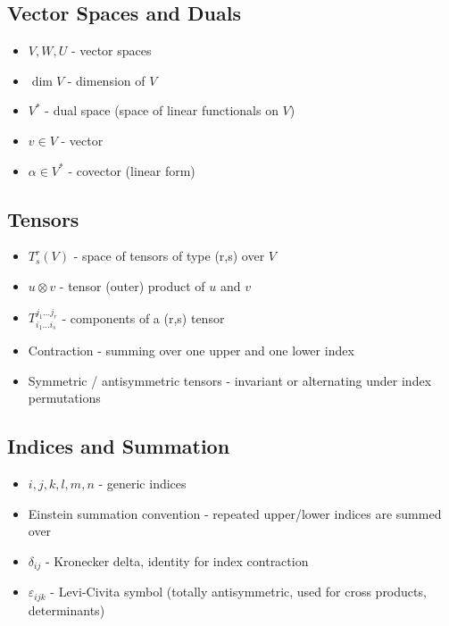 \documentclass[
  letterpaper,
  DIV=11,
  numbers=noendperiod]{scrreprt}
\providecommand{\tightlist}{%
  \setlength{\itemsep}{0pt}\setlength{\parskip}{0pt}}
\begin{document}
\subsection{Vector Spaces and Duals}\label{vector-spaces-and-duals}

\begin{itemize}
\tightlist
\item
  \(V, W, U\) - vector spaces
\item
  \(\dim V\) - dimension of \(V\)
\item
  \(V^*\) - dual space (space of linear functionals on \(V\))
\item
  \(v \in V\) - vector
\item
  \(\alpha \in V^*\) - covector (linear form)
\end{itemize}

\subsection{Tensors}\label{tensors}

\begin{itemize}
\tightlist
\item
  \(T^r_s(V)\) - space of tensors of type (r,s) over \(V\)
\item
  \(u \otimes v\) - tensor (outer) product of \(u\) and \(v\)
\item
  \(T_{i_1 \dots i_s}^{j_1 \dots j_r}\) - components of a (r,s) tensor
\item
  Contraction - summing over one upper and one lower index
\item
  Symmetric / antisymmetric tensors - invariant or alternating under
  index permutations
\end{itemize}

\subsection{Indices and Summation}\label{indices-and-summation}

\begin{itemize}
\tightlist
\item
  \(i,j,k,l,m,n\) - generic indices
\item
  Einstein summation convention - repeated upper/lower indices are
  summed over
\item
  \(\delta_{ij}\) - Kronecker delta, identity for index contraction
\item
  \(\varepsilon_{ijk}\) - Levi-Civita symbol (totally antisymmetric,
  used for cross products, determinants)
\end{itemize}
\end{document}
